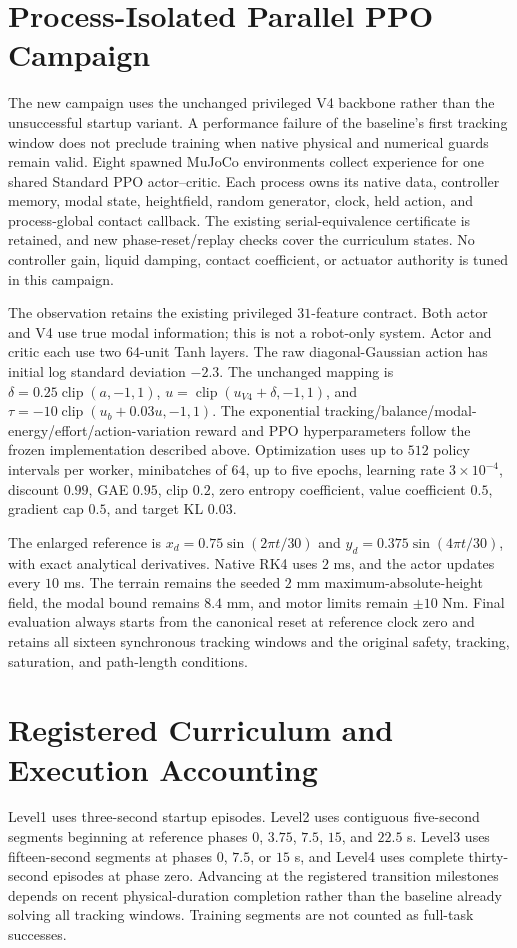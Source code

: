 \section{Process-Isolated Parallel PPO Campaign}
The new campaign uses the unchanged privileged V4 backbone rather than the unsuccessful startup variant. A performance failure of the baseline's first tracking window does not preclude training when native physical and numerical guards remain valid. Eight spawned MuJoCo environments collect experience for one shared Standard PPO actor--critic. Each process owns its native data, controller memory, modal state, heightfield, random generator, clock, held action, and process-global contact callback. The existing serial-equivalence certificate is retained, and new phase-reset/replay checks cover the curriculum states. No controller gain, liquid damping, contact coefficient, or actuator authority is tuned in this campaign.

The observation retains the existing privileged $31$-feature contract. Both actor and V4 use true modal information; this is not a robot-only system. Actor and critic each use two $64$-unit Tanh layers. The raw diagonal-Gaussian action has initial log standard deviation $-2.3$. The unchanged mapping is $\delta=0.25\operatorname{clip}(a,-1,1)$, $u=\operatorname{clip}(u_{V4}+\delta,-1,1)$, and $\tau=-10\operatorname{clip}(u_b+0.03u,-1,1)$. The exponential tracking/balance/modal-energy/effort/action-variation reward and PPO hyperparameters follow the frozen implementation described above. Optimization uses up to $512$ policy intervals per worker, minibatches of $64$, up to five epochs, learning rate $3\times10^{-4}$, discount $0.99$, GAE $0.95$, clip $0.2$, zero entropy coefficient, value coefficient $0.5$, gradient cap $0.5$, and target KL $0.03$.

The enlarged reference is $x_d=0.75\sin(2\pi t/30)$ and $y_d=0.375\sin(4\pi t/30)$, with exact analytical derivatives. Native RK4 uses $2$ ms, and the actor updates every $10$ ms. The terrain remains the seeded $2$ mm maximum-absolute-height field, the modal bound remains $8.4$ mm, and motor limits remain $\pm10$ Nm. Final evaluation always starts from the canonical reset at reference clock zero and retains all sixteen synchronous tracking windows and the original safety, tracking, saturation, and path-length conditions.

\section{Registered Curriculum and Execution Accounting}
Level1 uses three-second startup episodes. Level2 uses contiguous five-second segments beginning at reference phases $0$, $3.75$, $7.5$, $15$, and $22.5$ s. Level3 uses fifteen-second segments at phases $0$, $7.5$, or $15$ s, and Level4 uses complete thirty-second episodes at phase zero. Advancing at the registered transition milestones depends on recent physical-duration completion rather than the baseline already solving all tracking windows. Training segments are not counted as full-task successes.

